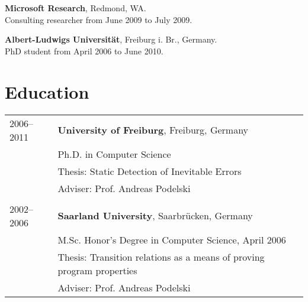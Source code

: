\documentclass[margin,line]{res}
\begin{document}
\begin{resume}
\textbf{Microsoft Research}, Redmond, WA.\\
Consulting researcher from June 2009 to July 2009.

\textbf{Albert-Ludwigs Universit\"at}, Freiburg i. Br., Germany.\\
PhD student from April 2006 to June 2010.

\bigskip
\section{\sc Education}

\begin{tabular}{@{}ll@{}}
2006--2011 & {\bf University of Freiburg}, Freiburg, Germany\\
& Ph.D. in Computer Science\\
& Thesis: Static Detection of Inevitable Errors\\
& Adviser: Prof. Andreas Podelski \\
\\
2002--2006 & {\bf Saarland University}, Saarbr\" ucken, Germany\\
& M.Sc. Honor's Degree in Computer Science, April 2006\\
& Thesis: Transition relations as a means of proving program properties\\
& Adviser: Prof. Andreas Podelski
\end{tabular}

\newpage

\bigskip

\bigskip

\bigskip
\newpage

\bigskip

\bigskip
%



\iffalse

\end{resume}
\end{document}
